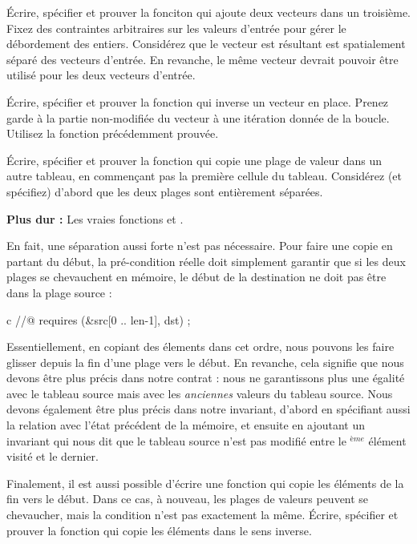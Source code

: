 Écrire, spécifier et prouver la fonciton qui ajoute deux vecteurs dans un
troisième. Fixez des contraintes arbitraires sur les valeurs d'entrée pour 
gérer le débordement des entiers. Considérez que le vecteur est résultant est
spatialement séparé des vecteurs d'entrée. En revanche, le même vecteur devrait
pouvoir être utilisé pour les deux vecteurs d'entrée.





Écrire, spécifier et prouver la fonction qui inverse un vecteur en place. Prenez
garde à la partie non-modifiée du vecteur à une itération donnée de la boucle.
Utilisez la fonction  précédemment prouvée.






Écrire, spécifier et prouver la fonction  qui copie une plage
de valeur dans un autre tableau, en commençant pas la première cellule du
tableau. Considérez (et spécifiez) d'abord que les deux plages sont entièrement
séparées.





\textbf{Plus dur :} Les vraies fonctions  et
.


En fait, une séparation aussi forte n'est pas nécessaire. Pour faire une copie
en partant du début, la pré-condition réelle doit simplement garantir que si les
deux plages se chevauchent en mémoire, le début de la destination ne doit pas être
dans la plage source :


\begin{CodeBlock}{c}
//@ requires \separated(&src[0 .. len-1], dst) ;
\end{CodeBlock}
 

Essentiellement, en copiant des élements dans cet ordre, nous pouvons les faire
glisser depuis la fin d'une plage vers le début. En revanche, cela signifie que
nous devons être plus précis dans notre contrat : nous ne garantissons plus une
égalité avec le tableau source mais avec les \emph{anciennes} valeurs du tableau
source. Nous devons également être plus précis dans notre invariant, d'abord en
spécifiant aussi la relation avec l'état précédent de la mémoire, et ensuite en
ajoutant un invariant qui nous dit que le tableau source n'est pas modifié entre
le $^{ème}$ élément visité et le dernier.


Finalement, il est aussi possible d'écrire une fonction qui copie les éléments de
la fin vers le début. Dans ce cas, à nouveau, les plages de valeurs peuvent se
chevaucher, mais la condition n'est pas exactement la même. Écrire, spécifier et
prouver la fonction  qui copie les éléments dans le
sens inverse.
